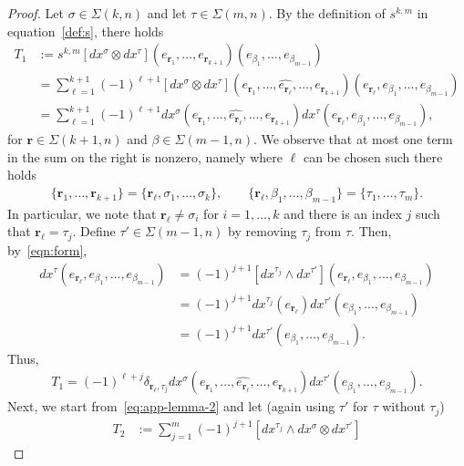 \documentclass[final]{amsart}%
\newcommand{\0}{\mathaccent23}
\newcommand{\br}{\mathbf r}
\begin{document}
\begin{proof}
Let $\sigma\in\Sigma(k,n)$ and let $\tau\in\Sigma(m,n)$.
By the definition of $s^{k,m}$ in equation~\eqref{def:s}, there holds
\begin{align*}
T_1 &:=
    s^{k,m}\left[dx^\sigma\otimes dx^\tau\right]
    (e_{\br_1},\dots,e_{\br_{k+1}})
    (e_{\beta_1},\dots,e_{\beta_{m-1}})\\
    &=\sum_{\ell=1}^{k+1} (-1)^{\ell+1} \left[dx^\sigma\otimes dx^\tau\right]
    (e_{\br_1},\dots,\widehat{e_{\br_\ell}},\dots, e_{\br_{k+1}})
    (e_{\br_\ell},e_{\beta_1},\dots,e_{\beta_{m-1}})\\
    &=\sum_{\ell=1}^{k+1} (-1)^{\ell+1} 
    dx^\sigma (e_{\br_1},\dots,\widehat{e_{\br_\ell}},\dots, e_{\br_{k+1}})
    dx^\tau (e_{\br_\ell},e_{\beta_1},\dots,e_{\beta_{m-1}}),
\end{align*}
for $\br\in\Sigma(k+1,n)$ and $\beta\in\Sigma(m-1,n)$. We observe that at most one term in the sum on the right is nonzero, namely where $\ell$ can be chosen such there holds
\begin{gather}
    \{\br_1,\dots,\br_{k+1}\}
    = \{\br_\ell,\sigma_1,\dots,\sigma_k\},
    \qquad
    \{\br_\ell,\beta_1,\dots,\beta_{m-1}\}
    =\{\tau_1,\dots,\tau_m\}.
\end{gather}
In particular, we note that $\br_\ell\neq\sigma_i$
for $i=1,\dots,k$ and there is an index $j$ such that $\br_\ell = \tau_j$. Define $\tau'\in\Sigma(m-1,n)$ by removing $\tau_j$ from $\tau$. Then, by~\eqref{eqn:form},
\begin{align*}
    dx^\tau(e_{\br_\ell},e_{\beta_1},\dots,e_{\beta_{m-1}})
    &=
    (-1)^{j+1} [dx^{\tau_j}\wedge dx^{\tau'}](e_{\br_\ell},e_{\beta_1},\dots,e_{\beta_{m-1}})\\
    &= (-1)^{j+1} dx^{\tau_j}(e_{\br_\ell})
    dx^{\tau'}(e_{\beta_1},\dots,e_{\beta_{m-1}})\\
    &= (-1)^{j+1}
    dx^{\tau'}(e_{\beta_1},\dots,e_{\beta_{m-1}}).
\end{align*}
Thus,
\begin{gather}
    \label{eq:app-T1-final}
    T_1 = (-1)^{\ell+j} \delta_{\br_\ell,\tau_j}
    dx^\sigma(e_{\br_1},\dots,\widehat{e_{\br_\ell}},\dots, e_{\br_{k+1}})
    dx^{\tau'}(e_{\beta_1},\dots,e_{\beta_{m-1}}).
\end{gather}
Next, we start from~\eqref{eq:app-lemma-2} and let (again using $\tau'$ for $\tau$ without $\tau_j$)
\begin{align*}
    T_2 &:= 
    \sum_{j=1}^m (-1)^{j+1}
    \left[dx^{\tau_j} \wedge dx^\sigma \otimes dx^{\tau'}\right]

\end{align*}
\end{proof}
\end{document}
